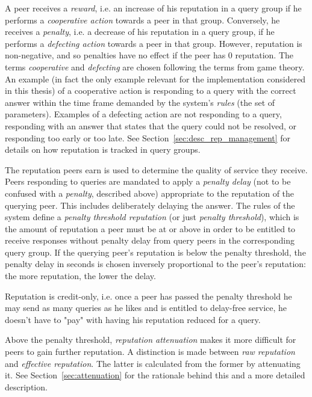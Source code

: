 A peer receives a \emph{reward}, i.e. an increase of his reputation in a query
group if he performs a \emph{cooperative action} towards a peer in that group.
Conversely, he receives a \emph{penalty}, i.e. a decrease of his reputation in a
query group, if he performs a \emph{defecting action} towards a peer in that
group. However, reputation is non-negative, and so penalties have no effect if
the peer has 0 reputation. The terms \emph{cooperative} and \emph{defecting} are
chosen following the terms from game theory. An example (in fact the only
example relevant for the implementation considered in this thesis) of a
cooperative action is responding to a query with the correct answer within the
time frame demanded by the system's \emph{rules} (the set of parameters).
Examples of a defecting action are not responding to a query, responding with an
answer that states that the query could not be resolved, or responding too early
or too late. See Section~\ref{sec:desc_rep_management} for details on how
reputation is tracked in query groups.

The reputation peers earn is used to determine the quality of service they
receive. Peers responding to queries are mandated to apply a \emph{penalty
delay} (not to be confused with a \emph{penalty}, described above) appropriate
to the reputation of the querying peer. This includes deliberately delaying the
answer. The rules of the system define a \emph{penalty threshold reputation} (or
just \emph{penalty threshold}), which is the amount of reputation a peer must be
at or above in order to be entitled to receive responses without penalty delay
from query peers in the corresponding query group. If the querying peer's
reputation is below the penalty threshold, the penalty delay in seconds is
chosen inversely proportional to the peer's reputation: the more reputation, the
lower the delay.

Reputation is credit-only, i.e. once a peer has passed the penalty threshold he
may send as many queries as he likes and is entitled to delay-free service, he
doesn't have to "pay" with having his reputation reduced for a query.

Above the penalty threshold, \emph{reputation attenuation} makes it more
difficult for peers to gain further reputation. A distinction is made between
\emph{raw reputation} and \emph{effective reputation}. The latter is calculated
from the former by attenuating it. See Section~\ref{sec:attenuation} for the
rationale behind this and a more detailed description.

